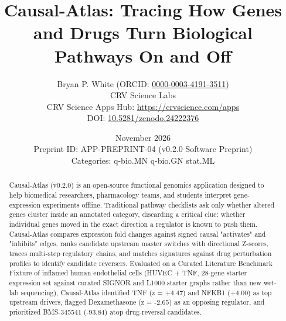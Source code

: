 \documentclass[10pt,letterpaper]{article}
\title{\textbf{Causal-Atlas: Tracing How Genes and Drugs Turn Biological Pathways On and Off}}
\author{Bryan P. White (ORCID: \href{https://orcid.org/0000-0003-4191-3511}{0000-0003-4191-3511}) \\ CRV Science Labs \\ \small CRV Science Apps Hub: \url{https://crvscience.com/apps} \\ \small DOI: \href{https://doi.org/10.5281/zenodo.24222376}{10.5281/zenodo.24222376}}
\date{November 2026 \\ \small Preprint ID: APP-PREPRINT-04 (v0.2.0 Software Preprint) \\ \small Categories: q-bio.MN \textbullet{} q-bio.GN \textbullet{} stat.ML}
\begin{document}
\maketitle

\begin{abstract}
Causal-Atlas (v0.2.0) is an open-source functional genomics application designed to help biomedical researchers, pharmacology teams, and students interpret gene-expression experiments offline. Traditional pathway checklists ask only whether altered genes cluster inside an annotated category, discarding a critical clue: whether individual genes moved in the exact direction a regulator is known to push them. Causal-Atlas compares expression fold changes against signed causal "activates" and "inhibits" edges, ranks candidate upstream master switches with directional Z-scores, traces multi-step regulatory chains, and matches signatures against drug perturbation profiles to identify candidate reversers. Evaluated on a Curated Literature Benchmark Fixture of inflamed human endothelial cells (HUVEC + TNF, 28-gene starter expression set against curated SIGNOR and L1000 starter graphs rather than new wet-lab sequencing), Causal-Atlas identified TNF (z = +4.47) and NFKB1 (+4.00) as top upstream drivers, flagged Dexamethasone (z = -2.65) as an opposing regulator, and prioritized BMS-345541 (-93.84) atop drug-reversal candidates.
\end{abstract}
\end{document}
